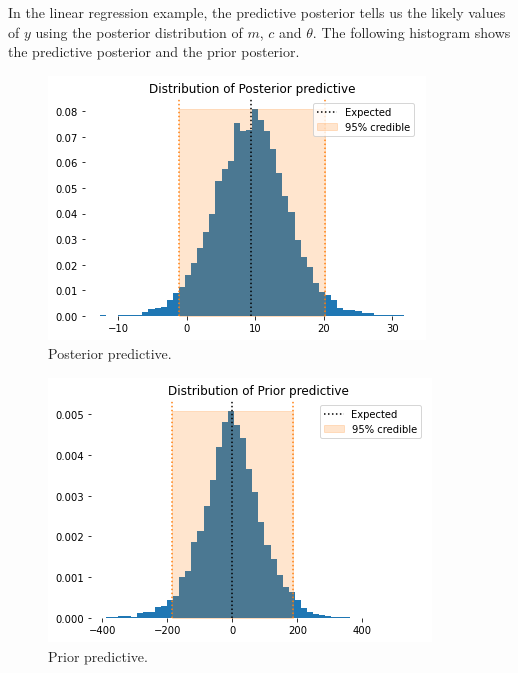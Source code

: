 \documentclass[a4paper, openany]{memoir}
\begin{document}
In the linear regression example, the predictive posterior tells us the likely values of $y$ using the posterior distribution of $m$, $c$ and $\theta$. The following histogram shows the predictive posterior and the prior posterior.
\begin{figure}[H]
    \centering
    \includegraphics[scale=0.6]{src/5.37 posterior predictive.png}
    \caption{Posterior predictive.}
\end{figure}
\begin{figure}[H]
    \centering
    \includegraphics[scale=0.6]{src/5.38 prior predictive.png}
    \caption{Prior predictive.}
\end{figure}
\end{document}

